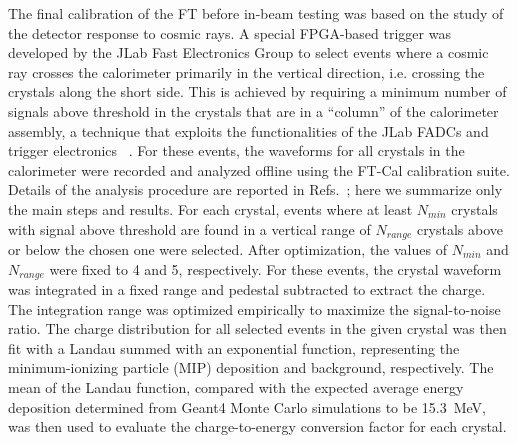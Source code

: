 The final calibration of the FT before in-beam testing was based on the study of the detector response to cosmic
rays. A special FPGA-based trigger was developed by the JLab Fast Electronics Group to select events where a
cosmic ray crosses the calorimeter primarily in the vertical direction, i.e. crossing the crystals along the short side.
This is achieved by requiring a minimum number of signals above threshold in the crystals that are in a ``column'' of
the calorimeter assembly, a technique that exploits the functionalities of the JLab FADCs and trigger electronics
~\cite{daq,trigger}. For these events, the waveforms for all crystals in the calorimeter were recorded and analyzed
offline using the FT-Cal calibration suite. Details of the analysis procedure are reported in
Refs.~\cite{cosmics1,cosmics2}; here we summarize only the main steps and results. For each crystal, events where
at least $N_{min}$ crystals with signal above threshold are found in a vertical range of $N_{range}$ crystals above or
below the chosen one were selected. After optimization, the values of $N_{min}$ and $N_{range}$ were fixed to 4 and 5,
respectively. For these events, the crystal waveform was integrated in a fixed range and pedestal subtracted to extract
the charge. The integration range was optimized empirically to maximize the signal-to-noise ratio. The charge distribution
for all selected events in the given crystal was then fit with a Landau summed with an exponential function,
representing the minimum-ionizing particle (MIP) deposition and background, respectively. The mean of the Landau
function, compared with the expected average energy deposition determined from Geant4 Monte Carlo simulations to
be 15.3~MeV, was then used to evaluate the charge-to-energy conversion factor for each crystal. 

